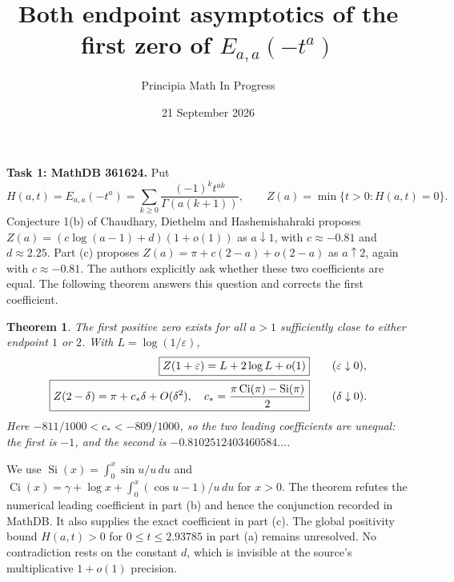 \documentclass[11pt]{article}
\title{Both endpoint asymptotics of the first zero of $E_{a,a}(-t^a)$}
\author{Principia Math In Progress}
\date{21 September 2026}
\newtheorem{theorem}{Theorem}
\newcommand{\Si}{\operatorname{Si}}
\newcommand{\Ci}{\operatorname{Ci}}
\begin{document}
\maketitle
\noindent\textbf{Task 1: MathDB 361624.}
Put
\[
 H(a,t)=E_{a,a}(-t^a)=\sum_{k\geq0}
       \frac{(-1)^kt^{ak}}{\Gamma(a(k+1))},
 \qquad Z(a)=\min\{t>0:H(a,t)=0\}.
\]
Conjecture 1(b) of Chaudhary, Diethelm and Hashemishahraki
\cite{CDH} proposes $Z(a)=(c\log(a-1)+d)(1+o(1))$ as
$a\downarrow1$, with $c\approx-0.81$ and $d\approx2.25$.
Part (c) proposes $Z(a)=\pi+c(2-a)+o(2-a)$ as $a\uparrow2$,
again with $c\approx-0.81$. The authors explicitly ask whether these
two coefficients are equal. The following theorem answers this question
and corrects the first coefficient.

\begin{theorem}\label{main}
The first positive zero exists for all $a>1$ sufficiently close to
either endpoint $1$ or $2$. With $L=\log(1/\varepsilon)$,
\begin{align*}
 \boxed{Z(1+\varepsilon)=L+2\log L+o(1)}
       &\qquad(\varepsilon\downarrow0),\\
 \boxed{Z(2-\delta)=\pi+c_*\delta+O(\delta^2),\quad
 c_*={\pi\Ci(\pi)-\Si(\pi)\over2}}
       &\qquad(\delta\downarrow0).
\end{align*}
Here $-811/1000<c_*<-809/1000$, so the two leading coefficients
are unequal: the first is $-1$, and the second is
$-0.8102512403460584\ldots$.
\end{theorem}

We use $\Si(x)=\int_0^x\sin u/u\,du$ and
$\Ci(x)=\gamma+\log x+\int_0^x(\cos u-1)/u\,du$ for $x>0$.
The theorem refutes the numerical leading coefficient in part (b)
and hence the conjunction recorded in MathDB. It also supplies the
exact coefficient in part (c). The global positivity bound
$H(a,t)>0$ for $0\leq t\leq2.93785$ in part (a) remains unresolved.
No contradiction rests on the constant $d$, which is invisible at
the source's multiplicative $1+o(1)$ precision.
\end{document}

